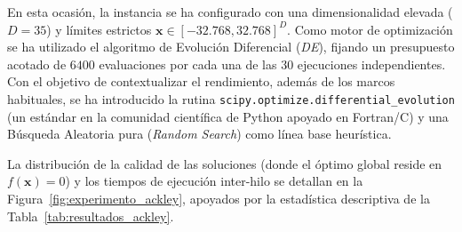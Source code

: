 \documentclass[12pt,a4paper,twoside,openright]{book}
\begin{document}
    En esta ocasión, la instancia se ha configurado con una dimensionalidad elevada ($D=35$) y límites estrictos $\mathbf{x} \in [-32.768, 32.768]^D$. Como motor de optimización se ha utilizado el algoritmo de Evolución Diferencial (\textit{DE}), fijando un presupuesto acotado de $6400$ evaluaciones por cada una de las $30$ ejecuciones independientes. Con el objetivo de contextualizar el rendimiento, además de los marcos habituales, se ha introducido la rutina \texttt{scipy.optimize.differential\_evolution} (un estándar en la comunidad científica de Python apoyado en Fortran/C) y una Búsqueda Aleatoria pura (\textit{Random Search}) como línea base heurística.

    La distribución de la calidad de las soluciones (donde el óptimo global reside en $f(\mathbf{x})=0$) y los tiempos de ejecución inter-hilo se detallan en la Figura~\ref{fig:experimento_ackley}, apoyados por la estadística descriptiva de la Tabla~\ref{tab:resultados_ackley}.
\end{document}
